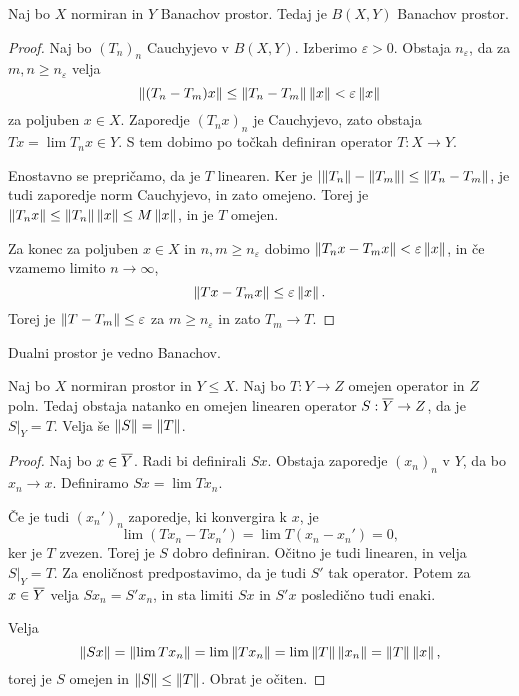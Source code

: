 \begin{izrek}
  Naj bo $X$ normiran in $Y$ Banachov prostor.
  Tedaj je $B(X,Y)$ Banachov prostor.
\end{izrek}

\begin{proof}
  Naj bo $(T_n)_n$ Cauchyjevo v $B(X,Y)$.
  Izberimo $\varepsilon > 0$.
  Obstaja $n_\varepsilon$, da za $m, n \ge n_\varepsilon$ velja
  \[
	\left\lVert(T_n - T_m) x\right\rVert \le \left\lVert T_n - T_m\right\rVert \left\lVert x\right\rVert < \varepsilon \left\lVert x\right\rVert
  \]
  za poljuben $x \in X$.
  Zaporedje $(T_n x)_n$ je Cauchyjevo, zato obstaja $Tx = \lim T_nx \in Y$.
  S tem dobimo po točkah definiran operator $T: X \to Y$.

  Enostavno se prepričamo, da je $T$ linearen.
  Ker je $\left| \left\lVert T_n\right\rVert - \left\lVert T_m\right\rVert \right| \le \left\lVert T_n - T_m\right\rVert$, je tudi zaporedje
  norm Cauchyjevo, in zato omejeno.
  Torej je $\left\lVert T_n x\right\rVert \le \left\lVert T_n\right\rVert \left\lVert x\right\rVert \le M \left\lVert x\right\rVert$, in je $T$
  omejen.

  Za konec za poljuben $x \in X$ in $n, m \ge n_\varepsilon$ dobimo $\left\lVert T_n x
	- T_m x\right\rVert < \varepsilon \left\lVert x\right\rVert$, in če vzamemo limito $n \to \infty$,
  \[
	\left\lVert Tx - T_m x\right\rVert \le \varepsilon \left\lVert x\right\rVert.
  \]
  Torej je $\left\lVert T - T_m\right\rVert \le \varepsilon$ za $m \ge n_\varepsilon$ in zato
  $T_m \to T$.
\end{proof}


\begin{posledica}
  Dualni prostor je vedno Banachov.
\end{posledica}

\begin{izrek}
  Naj bo $X$ normiran prostor in $Y \le X$.
  Naj bo $T: Y \to Z$ omejen operator in $Z$ poln.
  Tedaj obstaja natanko en omejen linearen operator $S: \overline{Y} \to Z$, da je
  $\left. S \right|_Y = T$.
  Velja še $\left\lVert S\right\rVert = \left\lVert T\right\rVert$.
\end{izrek}

\begin{proof}
  Naj bo $x \in \overline{Y}$.
  Radi bi definirali $Sx$.
  Obstaja zaporedje $(x_n)_n$ v $Y$, da bo $x_n \to x$.
  Definiramo $Sx = \lim T x_n$.

  Če je tudi $(x_n')_n$ zaporedje, ki konvergira k $x$, je
  \[
	\lim (T x_n - T x_n') = \lim T(x_n - x_n') = 0,
  \]
  ker je $T$ zvezen.
  Torej je $S$ dobro definiran.
  Očitno je tudi linearen, in velja $\left. S \right|_Y = T$.
  Za enoličnost predpostavimo, da je tudi $S'$ tak operator.
  Potem za $x \in \overline{Y}$ velja $S x_n = S' x_n$, in sta limiti $Sx$ in $S' x$
  posledično tudi enaki.

  Velja
  \[
	\left\lVert Sx\right\rVert = \left\lVert\lim T x_n\right\rVert = \lim \left\lVert T x_n\right\rVert
	= \lim \left\lVert T\right\rVert \left\lVert x_n\right\rVert = \left\lVert T\right\rVert \left\lVert x\right\rVert,
  \]
  torej je $S$ omejen in $\left\lVert S\right\rVert \le \left\lVert T\right\rVert$.
  Obrat je očiten.
\end{proof}

